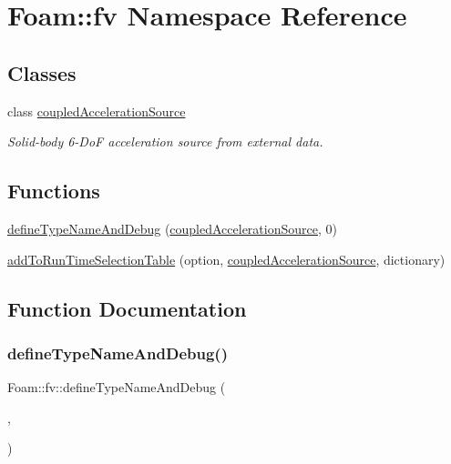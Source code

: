 \hypertarget{namespaceFoam_1_1fv}{}\section{Foam\+:\+:fv Namespace Reference}
\label{namespaceFoam_1_1fv}
\subsection*{Classes}
\begin{DoxyCompactItemize}
\item 
class \hyperlink{classFoam_1_1fv_1_1coupledAccelerationSource}{coupled\+Acceleration\+Source}
\begin{DoxyCompactList}\small\item\em Solid-\/body 6-\/\+DoF acceleration source from external data. \end{DoxyCompactList}\end{DoxyCompactItemize}
\subsection*{Functions}
\begin{DoxyCompactItemize}
\item 
\hyperlink{namespaceFoam_1_1fv_a5386e953d17f622101deba6348da3d13}{define\+Type\+Name\+And\+Debug} (\hyperlink{classFoam_1_1fv_1_1coupledAccelerationSource}{coupled\+Acceleration\+Source}, 0)
\item 
\hyperlink{namespaceFoam_1_1fv_a1f632a3d6c6e680bdcb778de19598fce}{add\+To\+Run\+Time\+Selection\+Table} (option, \hyperlink{classFoam_1_1fv_1_1coupledAccelerationSource}{coupled\+Acceleration\+Source}, dictionary)
\end{DoxyCompactItemize}


\subsection{Function Documentation}
\mbox{\label{namespaceFoam_1_1fv_a5386e953d17f622101deba6348da3d13}} 
\subsubsection{\texorpdfstring{define\+Type\+Name\+And\+Debug()}{defineTypeNameAndDebug()}}
{\footnotesize\ttfamily Foam\+::fv\+::define\+Type\+Name\+And\+Debug (\begin{DoxyParamCaption}\item[{\hyperlink{classFoam_1_1fv_1_1coupledAccelerationSource}{coupled\+Acceleration\+Source}}]{,  }\item[{0}]{ }\end{DoxyParamCaption})}

